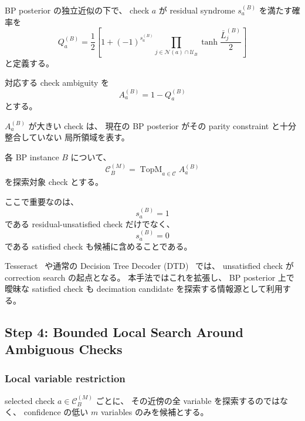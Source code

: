 BP posterior の独立近似の下で、
check $a$ が residual syndrome $s_a^{(B)}$ を満たす確率を
\begin{equation}
    Q_a^{(B)}
    =
    \frac{1}{2}
    \left[
        1
        +
        (-1)^{s_a^{(B)}}
        \prod_{j\in\mathcal{N}(a)\cap\mathcal{U}_B}
        \tanh\frac{\bar L_j^{(B)}}{2}
    \right]
    \label{eq:check_probability}
\end{equation}
と定義する。

対応する check ambiguity を
\begin{equation}
    A_a^{(B)}
    =
    1-Q_a^{(B)}
    \label{eq:check_ambiguity}
\end{equation}
とする。

$A_a^{(B)}$ が大きい check は、
現在の BP posterior がその parity constraint と十分整合していない
局所領域を表す。

各 BP instance $B$ について、
\begin{equation}
    \mathcal{C}_B^{(M)}
    =
    \operatorname{TopM}_{a\in\mathcal{C}}
    A_a^{(B)}
\end{equation}
を探索対象 check とする。

ここで重要なのは、
\begin{equation}
    s_a^{(B)}=1
\end{equation}
である residual-unsatisfied check だけでなく、
\begin{equation}
    s_a^{(B)}=0
\end{equation}
である satisfied check も候補に含めることである。

Tesseract~\cite{tesseract} や通常の Decision Tree Decoder
(DTD)~\cite{dtd} では、
unsatisfied check が correction search の起点となる。
本手法ではこれを拡張し、
BP posterior 上で曖昧な satisfied check も
decimation candidate を探索する情報源として利用する。


\subsection{Step 4: Bounded Local Search Around Ambiguous Checks}

\subsubsection{Local variable restriction}

selected check $a\in\mathcal{C}_B^{(M)}$ ごとに、
その近傍の全 variable を探索するのではなく、
confidence の低い $m$ variables のみを候補とする。

